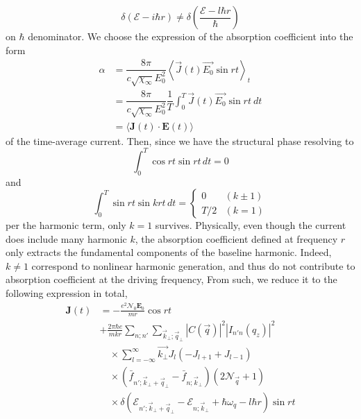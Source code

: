 \documentclass[%
 reprint,
 amsmath,amssymb,
 aps,
]{revtex4-2}
\begin{document}
\begin{equation}
    \delta (\mathcal{E}-i\hbar r)\neq \delta\left(\frac{\mathcal{E}-l\hbar r}{\hbar}\right)
\end{equation}
on $\hbar$ denominator. We choose the expression of the absorption coefficient into the form
\begin{equation}
    \begin{split}
        \alpha &= \dfrac{8\pi}{c\sqrt{\chi_\infty}E_{0}^2}\left\langle\vec{J}(t) \vec{E_0}\sin{rt} \right\rangle_{t}\\
    & = \dfrac{8\pi}{c\sqrt{\chi_\infty}E_{0}^2}\dfrac{1}{T}\int_{0}^{T}\vec{J}(t)\vec{E_0}\sin{rt} \: dt\\
    & = \langle \mathbf{J}(t) \cdot \mathbf{E}(t)\rangle 
    \end{split}
\end{equation}
of the time-average current. Then, since we have the structural phase resolving to
\begin{equation}
    \int_{0}^{T}\cos{rt} \sin{rt} \, dt = 0
\end{equation}
and
\begin{equation}
     \int_{0}^T \sin{rt} \sin{k r t} \, dt = \begin{cases}
        0 & (k \pm 1) \\
        T/2 & (k = 1)
    \end{cases}
\end{equation}
per the harmonic term, only $k=1$ survives. Physically, even though the current does include many harmonic $k$, the absorption coefficient defined at frequency $r$ only extracts the fundamental components of the baseline harmonic. Indeed, $k\neq 1$ correspond to nonlinear harmonic generation, and thus do not contribute to absorption coefficient at the driving frequency, From such, we reduce it to the following expression in total,
\begin{equation}
    \begin{split}
        \mathbf{J}(t) &= -\frac{e^2 \mathcal{N}_0 \mathbf{E}_0}{m r} \cos rt \\
        &+ \frac{2\pi \hbar e}{m k r} \sum_{n;n'} \sum_{\vec{k}_\bot; \vec{q}_\bot} |C(\vec{q})|^2 |I_{n'n}(q_z)|^2 \\
        &\quad\times \sum_{l=-\infty}^{\infty} \vec{k_\bot} J_l (-J_{l+1} + J_{l-1}) \\
        &\quad\times (\bar{f}_{n'; \vec{k}_\bot+\vec{q}_\bot} - \bar{f}_{n; \vec{k}_\bot}) (2\mathcal{N}_{\vec{q}} + 1) \\
        &\quad\times \delta(\mathcal{E}_{n'; \vec{k}_\bot+\vec{q}_\bot} - \mathcal{E}_{n; \vec{k}_\bot} + \hbar \omega_q - l \hbar r) \sin rt
    \end{split}
\end{equation}
\end{document}
